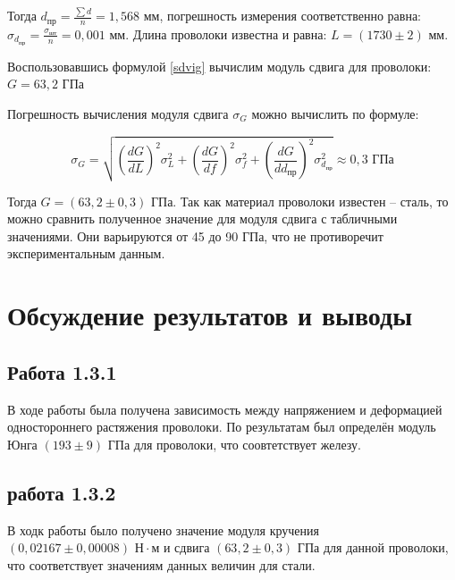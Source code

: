 \documentclass[a4paper,12pt]{article}
\begin{document}
Тогда $d_\text{пр} = \frac{\sum d}{n} = 1,568$ мм, погрешность измерения соответственно равна: $\sigma_{d_\text{пр}} = \frac{\sigma_\text{шт}}{n} = 0,001$ мм. Длина проволоки известна и равна: $L = (1730 \pm 2) \text{ мм}$.

Воспользовавшись формулой \eqref{sdvig} вычислим модуль сдвига для проволоки: $G = 63,2 \text{ ГПа}$

Погрешность вычисления модуля сдвига $\sigma_G$ можно вычислить по формуле:

\begin{equation}
    \sigma_G = \sqrt{
    \left( \frac{dG}{dL} \right)^2 \sigma_{L}^2 +
    \left( \frac{dG}{df} \right)^2 \sigma_{f}^2 +
    \left( \frac{dG}{dd_\text{пр}} \right)^2 \sigma_{d_\text{пр}}^2
    } \approx 0,3 \text{ ГПа}
\end{equation}

Тогда $G = (63,2 \pm 0,3) \text{ ГПа}$. Так как материал проволоки известен -- сталь, то можно сравнить полученное значение для модуля сдвига с табличными значениями. Они варьируются от 45 до 90 ГПа, что не противоречит экспериментальным данным.

\section{Обсуждение результатов и выводы}

\subsection{Работа 1.3.1}

В ходе работы была получена зависимость между напряжением и деформацией одностороннего растяжения проволоки. По результатам был определён модуль Юнга $(193 \pm 9) \text{ ГПа}$ для проволоки, что соовтетствует железу.

\subsection{работа 1.3.2}

В ходк работы было получено значение модуля кручения $(0,02167 \pm 0,00008) \text{ Н} \cdot \text{м}$ и сдвига $(63,2 \pm 0,3) \text{ ГПа}$ для данной проволоки, что соответствует значениям данных величин для стали.

\newpage
\end{document}
